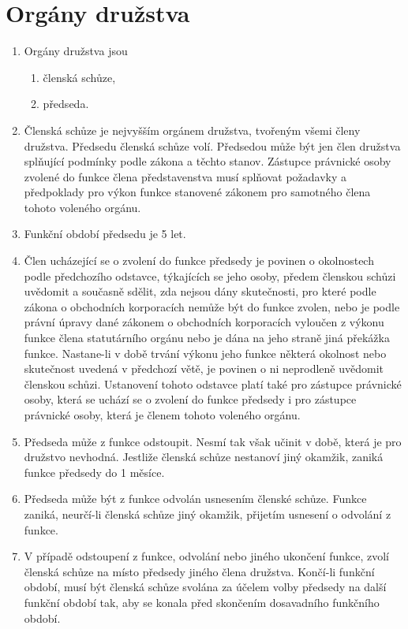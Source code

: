 \section{Orgány družstva}
\begin{enumerate}
    \item Orgány družstva jsou
    \begin{enumerate}[label=\alph*.]
        \item členská schůze,
        \item předseda.
    \end{enumerate}
    \item Členská schůze je nejvyšším orgánem družstva, tvořeným všemi členy družstva. Předsedu členská schůze volí. Předsedou může být jen člen družstva splňující podmínky podle zákona a těchto stanov. Zástupce právnické osoby zvolené do funkce člena představenstva musí splňovat požadavky a předpoklady pro výkon funkce stanovené zákonem pro samotného člena tohoto voleného orgánu.
    \item Funkční období předsedu je 5 let.
    \item Člen ucházející se o zvolení do funkce předsedy je povinen o okolnostech podle předchozího odstavce, týkajících se jeho osoby, předem členskou schůzi uvědomit a současně sdělit, zda nejsou dány skutečnosti, pro které podle zákona o obchodních korporacích nemůže být do funkce zvolen, nebo je podle právní úpravy dané zákonem o obchodních korporacích vyloučen z výkonu funkce člena statutárního orgánu nebo je dána na jeho straně jiná překážka funkce. Nastane-li v době trvání výkonu jeho funkce některá okolnost nebo skutečnost uvedená v předchozí větě, je povinen o ni neprodleně uvědomit členskou schůzi. Ustanovení tohoto odstavce platí také pro zástupce právnické osoby, která se uchází se o zvolení do funkce předsedy i pro zástupce právnické osoby, která je členem tohoto voleného orgánu.
    \item Předseda může z funkce odstoupit. Nesmí tak však učinit v době, která je pro družstvo nevhodná. Jestliže členská schůze nestanoví jiný okamžik, zaniká funkce předsedy do 1 měsíce.
    \item Předseda může být z funkce odvolán usnesením členské schůze. Funkce zaniká, neurčí-li členská schůze jiný okamžik, přijetím usnesení o odvolání z funkce.
    \item V případě odstoupení z funkce, odvolání nebo jiného ukončení funkce, zvolí členská schůze na místo předsedy jiného člena družstva. Končí-li funkční období, musí být členská schůze svolána za účelem volby předsedy na další funkční období tak, aby se konala před skončením dosavadního funkčního období.
\end{enumerate}

